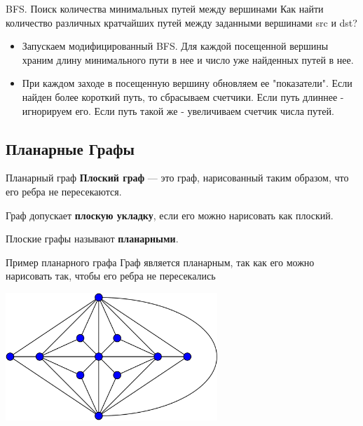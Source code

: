 \documentclass[10pt]{beamer}
\begin{document}
\begin{frame}[fragile]{BFS. Поиск количества минимальных путей между вершинами}
Как найти количество различных кратчайших путей между заданными вершинами src и dst?
    \begin{itemize}
        \item Запускаем модифицированный BFS. Для каждой посещенной вершины храним длину минимального пути в нее и число уже найденных путей в нее.
        \item При каждом заходе в посещенную вершину обновляем ее "показатели". Если найден более короткий путь, то сбрасываем счетчики. Если путь длиннее - игнорируем его. Если путь такой же - увеличиваем счетчик числа путей.
    \end{itemize}
    
\end{frame}

\subsection{Планарные Графы}

\begin{frame}[fragile]{Планарный граф}
\textbf{Плоский граф} — это граф, нарисованный таким образом, что его ребра не пересекаются. 

Граф допускает \textbf{плоскую укладку}, если его можно нарисовать как плоский. 

Плоские графы называют \textbf{планарными}.
    
\end{frame}

\begin{frame}[fragile]{Пример планарного графа}
Граф является планарным, так как его можно нарисовать так, чтобы его ребра не пересекались
\begin{center}
    \includegraphics[width=8cm]{Term_2/Source/images/4_planar.png}
\end{center}
\end{frame}
\end{document}
